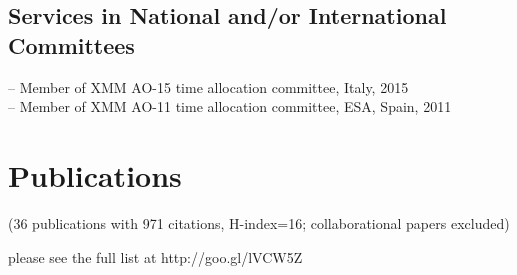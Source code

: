 \documentclass{article} \oddsidemargin -0,05 cm \textwidth
\begin{document}
\subsection*{Services in National and/or International Committees}
-- Member of XMM AO-15 time allocation committee, Italy, 2015 \\
-- Member of XMM AO-11 time allocation committee, ESA, Spain, 2011 \\

\newpage
\section*{Publications}
\begingroup
{\small
  \renewcommand{\section}[2]{}
  (36 publications with 971 citations, H-index=16; collaborational papers excluded)
  
 \nocite{*}
  
}
\endgroup
\vspace{1cm}
please see the full list at http://goo.gl/lVCW5Z
\end{document}
